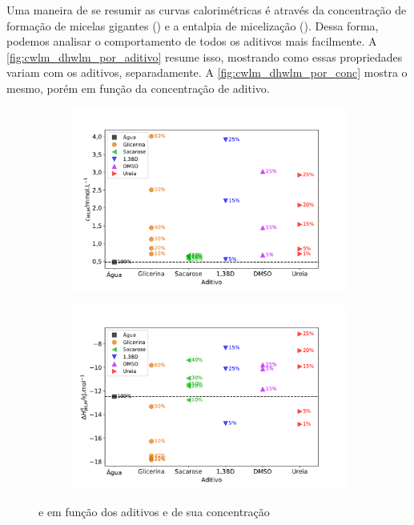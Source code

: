 			Uma maneira de se resumir as curvas calorimétricas é através da concentração de formação de micelas gigantes (\cwlm) e a entalpia de micelização (\DHwlm). Dessa forma, podemos analisar o comportamento de todos os aditivos mais facilmente. A \autoref{fig:cwlm_dhwlm_por_aditivo} resume isso, mostrando como essas propriedades variam com os aditivos, separadamente. A \autoref{fig:cwlm_dhwlm_por_conc} mostra o mesmo, porém em função da concentração de aditivo.
			
			\begin{figure}[h]
				\begin{subfigure}[t]{0.5\textwidth}
					\centering
					\includegraphics[width=\textwidth]{imagens/itc/Cwlm_por_Aditivo}
					\caption{\cwlm{}}
					\label{fig:cwlm_por_aditivo}
				\end{subfigure}%
				\begin{subfigure}[t]{0.5\textwidth}
					\centering
					\includegraphics[width=\textwidth]{imagens/itc/DHwlm_por_Aditivo}
					\caption{\DHwlm{}}
					\label{fig:dhwlm_por_aditivo}
				\end{subfigure}
				\caption{\cwlm{} e \DHwlm{} em função dos aditivos e de sua concentração}
				\label{fig:cwlm_dhwlm_por_aditivo}
			\end{figure} 
		

